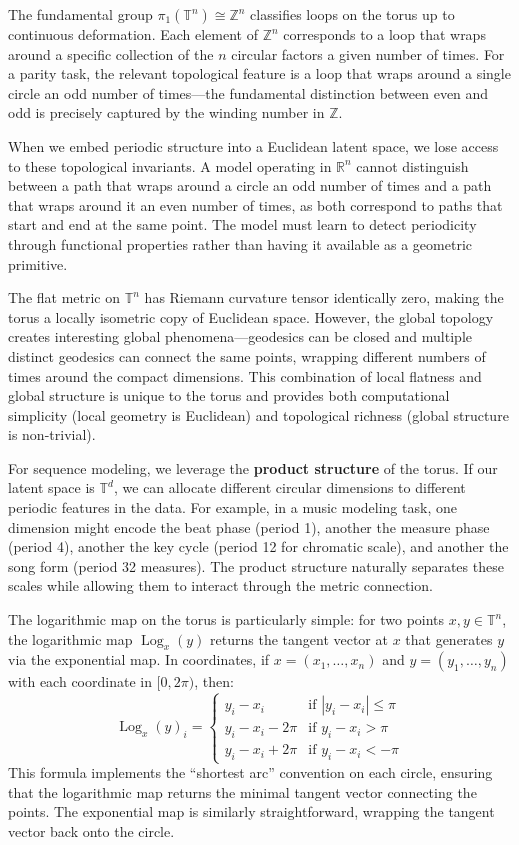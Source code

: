 \documentclass[12pt,letterpaper,twoside]{article}
\newcommand{\R}{\mathbb{R}}
\newcommand{\T}{\mathbb{T}}
\newcommand{\Z}{\mathbb{Z}}
\DeclareMathOperator{\Log}{Log}
\begin{document}
The fundamental group $\pi_1(\T^n) \cong \Z^n$ classifies loops on the torus up to continuous deformation. Each element of $\Z^n$ corresponds to a loop that wraps around a specific collection of the $n$ circular factors a given number of times. For a parity task, the relevant topological feature is a loop that wraps around a single circle an odd number of times—the fundamental distinction between even and odd is precisely captured by the winding number in $\Z$.

When we embed periodic structure into a Euclidean latent space, we lose access to these topological invariants. A model operating in $\R^n$ cannot distinguish between a path that wraps around a circle an odd number of times and a path that wraps around it an even number of times, as both correspond to paths that start and end at the same point. The model must learn to detect periodicity through functional properties rather than having it available as a geometric primitive.

The flat metric on $\T^n$ has Riemann curvature tensor identically zero, making the torus a locally isometric copy of Euclidean space. However, the global topology creates interesting global phenomena—geodesics can be closed and multiple distinct geodesics can connect the same points, wrapping different numbers of times around the compact dimensions. This combination of local flatness and global structure is unique to the torus and provides both computational simplicity (local geometry is Euclidean) and topological richness (global structure is non-trivial).

For sequence modeling, we leverage the \textbf{product structure} of the torus. If our latent space is $\T^d$, we can allocate different circular dimensions to different periodic features in the data. For example, in a music modeling task, one dimension might encode the beat phase (period 1), another the measure phase (period 4), another the key cycle (period 12 for chromatic scale), and another the song form (period 32 measures). The product structure naturally separates these scales while allowing them to interact through the metric connection.

The logarithmic map on the torus is particularly simple: for two points $x, y \in \T^n$, the logarithmic map $\Log_x(y)$ returns the tangent vector at $x$ that generates $y$ via the exponential map. In coordinates, if $x = (x_1, \ldots, x_n)$ and $y = (y_1, \ldots, y_n)$ with each coordinate in $[0, 2\pi)$, then:
\begin{equation}
\Log_x(y)_i = \begin{cases}
y_i - x_i & \text{if } |y_i - x_i| \leq \pi \\
y_i - x_i - 2\pi & \text{if } y_i - x_i > \pi \\
y_i - x_i + 2\pi & \text{if } y_i - x_i < -\pi
\end{cases}
\end{equation}
This formula implements the ``shortest arc'' convention on each circle, ensuring that the logarithmic map returns the minimal tangent vector connecting the points. The exponential map is similarly straightforward, wrapping the tangent vector back onto the circle.
\end{document}
